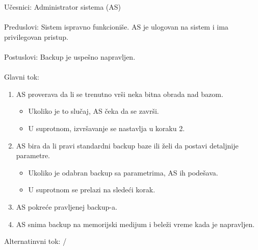 \noindent U\v cesnici: Administrator sistema (AS)
\\
\\ Preduslovi: Sistem ispravno funkcioni\v se. AS je ulogovan na sistem i ima privilegovan pristup.
\\
\\ Postuslovi: Backup je uspe\v sno napravljen.
\\
\\ Glavni tok:
\begin{enumerate}
	\item AS proverava da li se trenutno vr\v si neka bitna obrada nad bazom.
	\begin{itemize}
		\item Ukoliko je to slu\v caj, AS \v ceka da se zavr\v si.
		\item U suprotnom, izvr\v savanje se nastavlja u koraku 2.
	\end{itemize}
	\item AS bira da li pravi standardni backup baze ili \v zeli da postavi detaljnije parametre.
	\begin{itemize}
		\item Ukoliko je odabran backup sa parametrima, AS ih pode\v sava.
		\item U suprotnom se prelazi na slede\' ci korak.
	\end{itemize}
	\item AS pokre\' ce pravljenej backup-a.
	\item AS snima backup na memorijski medijum i bele\v zi vreme kada je napravljen.
\end{enumerate}

\noindent Alternatinvni tok: /